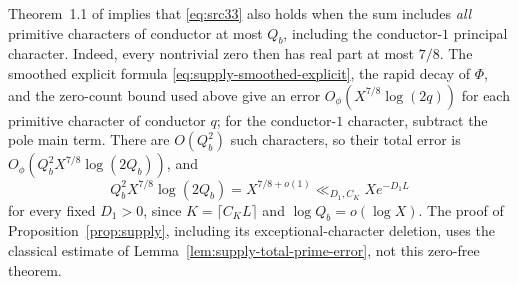 \begin{remark}
Theorem~1.1 of \cite{OpenAIQRH2026} implies that
\eqref{eq:src33} also holds when the sum includes \emph{all} primitive
characters of conductor at most \(Q_b\), including the conductor-\(1\)
principal character. Indeed, every nontrivial zero then has real part at
most \(7/8\). The smoothed explicit formula
\eqref{eq:supply-smoothed-explicit}, the rapid decay of \(\Phi\), and the
zero-count bound used above give an error
\(O_\phi(X^{7/8}\log(2q))\) for each primitive character of conductor
\(q\); for the conductor-\(1\) character, subtract the pole main term.
There are \(O(Q_b^2)\) such characters, so their total error is
\(O_\phi(Q_b^2X^{7/8}\log(2Q_b))\), and
\[
 Q_b^2X^{7/8}\log(2Q_b)=X^{7/8+o(1)}
   \ll_{D_1,C_K}Xe^{-D_1L}
\]
for every fixed \(D_1>0\), since
\(K=\lceil C_KL\rceil\) and \(\log Q_b=o(\log X)\).
The proof of Proposition~\ref{prop:supply}, including its
exceptional-character deletion, uses the classical estimate of
Lemma~\ref{lem:supply-total-prime-error}, not this zero-free theorem.
\end{remark}
